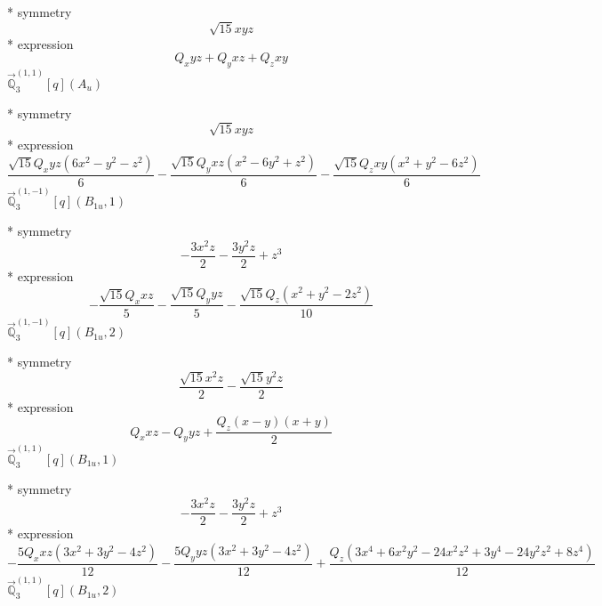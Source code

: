 \documentclass[fleqn,8pt]{jsarticle}
\begin{document}
\noindent\quad ** symmetry
\begin{dmath*}
\sqrt{15} x y z
\end{dmath*}
\noindent\quad ** expression
\begin{dmath*}
Q_{x} y z + Q_{y} x z + Q_{z} x y
\end{dmath*}
\noindent\quad $\vec{\mathbb{Q}}_{3}^{(1,1)}[q](A_{u})$

\noindent\quad ** symmetry
\begin{dmath*}
\sqrt{15} x y z
\end{dmath*}
\noindent\quad ** expression
\begin{dmath*}
\frac{\sqrt{15} Q_{x} y z \left(6 x^{2} - y^{2} - z^{2}\right)}{6} - \frac{\sqrt{15} Q_{y} x z \left(x^{2} - 6 y^{2} + z^{2}\right)}{6} - \frac{\sqrt{15} Q_{z} x y \left(x^{2} + y^{2} - 6 z^{2}\right)}{6}
\end{dmath*}
\noindent\quad $\vec{\mathbb{Q}}_{3}^{(1,-1)}[q](B_{1u},1)$

\noindent\quad ** symmetry
\begin{dmath*}
- \frac{3 x^{2} z}{2} - \frac{3 y^{2} z}{2} + z^{3}
\end{dmath*}
\noindent\quad ** expression
\begin{dmath*}
- \frac{\sqrt{15} Q_{x} x z}{5} - \frac{\sqrt{15} Q_{y} y z}{5} - \frac{\sqrt{15} Q_{z} \left(x^{2} + y^{2} - 2 z^{2}\right)}{10}
\end{dmath*}
\noindent\quad $\vec{\mathbb{Q}}_{3}^{(1,-1)}[q](B_{1u},2)$

\noindent\quad ** symmetry
\begin{dmath*}
\frac{\sqrt{15} x^{2} z}{2} - \frac{\sqrt{15} y^{2} z}{2}
\end{dmath*}
\noindent\quad ** expression
\begin{dmath*}
Q_{x} x z - Q_{y} y z + \frac{Q_{z} \left(x - y\right) \left(x + y\right)}{2}
\end{dmath*}
\noindent\quad $\vec{\mathbb{Q}}_{3}^{(1,1)}[q](B_{1u},1)$

\noindent\quad ** symmetry
\begin{dmath*}
- \frac{3 x^{2} z}{2} - \frac{3 y^{2} z}{2} + z^{3}
\end{dmath*}
\noindent\quad ** expression
\begin{dmath*}
- \frac{5 Q_{x} x z \left(3 x^{2} + 3 y^{2} - 4 z^{2}\right)}{12} - \frac{5 Q_{y} y z \left(3 x^{2} + 3 y^{2} - 4 z^{2}\right)}{12} + \frac{Q_{z} \left(3 x^{4} + 6 x^{2} y^{2} - 24 x^{2} z^{2} + 3 y^{4} - 24 y^{2} z^{2} + 8 z^{4}\right)}{12}
\end{dmath*}
\noindent\quad $\vec{\mathbb{Q}}_{3}^{(1,1)}[q](B_{1u},2)$
\end{document}
